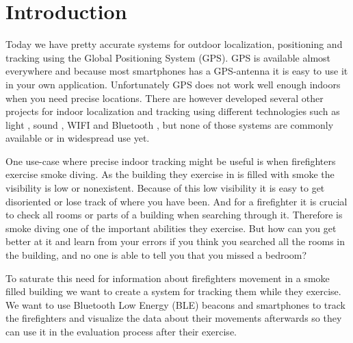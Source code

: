 \documentclass[../Main/thesis.tex]{subfiles}
\begin{document}
\chapter{Introduction}
\label{ch:introduction}

 
Today we have pretty accurate systems for outdoor localization, positioning and tracking using the Global Positioning System (GPS). 
GPS is available almost everywhere and because most smartphones has a GPS-antenna it is easy to use it in your own application. 
Unfortunately GPS does not work well enough indoors when you need precise locations.
There are however developed several other projects for indoor localization and tracking using different technologies such as light \citep{xiaohan2010improved}, sound \citep{schweinzer2010ultrasonic}, WIFI  \citep{chang2010robust} and Bluetooth , but none of those systems are commonly available or in widespread use yet.

One use-case where precise indoor tracking might be useful is when firefighters exercise smoke diving. 
As the building they exercise in is filled with smoke the visibility is low or nonexistent.
Because of this low visibility it is easy to get disoriented or lose track of where you have been.
And for a firefighter it is crucial to check all rooms or parts of a building when searching through it.
Therefore is smoke diving one of the important abilities they exercise.
But how can you get better at it and learn from your errors if you think you searched all the rooms in the building, and no one is able to tell you that you missed a bedroom?

To saturate this need for information about firefighters movement in a smoke filled building we want to create a system for tracking them while they exercise.
We want to use Bluetooth Low Energy (BLE) beacons and smartphones to track the firefighters and visualize the data about their movements afterwards so they can use it in the evaluation process after their exercise.
\end{document}
